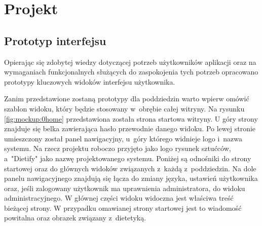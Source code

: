 \chapter{Projekt}\label{ch:project}

%
%
%
%
%
%

\section{Prototyp interfejsu}\label{sec:mockups}

Opierając się zdobytej wiedzy dotyczącej potrzeb użytkowników aplikacji
oraz na wymaganiach funkcjonalnych służących do zaspokojenia tych potrzeb
opracowano prototypy kluczowych widoków interfejsu użytkownika.
\par
Zanim przedstawione zostaną prototypy dla poddziedzin warto wpierw omówić szablon widoku, który będzie stosowany w~obrębie całej witryny.
Na rysunku \ref{fig:mockup:0home} przedstawiona została strona startowa witryny.
U góry strony znajduje się belka zawierająca hasło przewodnie danego widoku.
Po lewej stronie umieszczony został panel nawigacyjny, u~góry którego widnieje logo i~nazwa systemu.
Na rzecz projektu roboczo przyjęto jako logo rysunek sztućców, a~"Dietify" jako nazwę projektowanego systemu.
Poniżej są odnośniki do strony startowej oraz do głównych widoków związanych z~każdą z~poddziedzin.
Na dole panelu nawigacyjnego znajdują się łącza do zmiany języka, ustawień użytkownika oraz, jeśli zalogowany użytkownik ma uprawnienia administratora, do widoku administracyjnego.
W głównej części widoku widoczna jest właściwa treść bieżącej strony.
W przypadku omawianej strony startowej jest to wiadomość powitalna oraz obrazek związany z~dietetyką.

